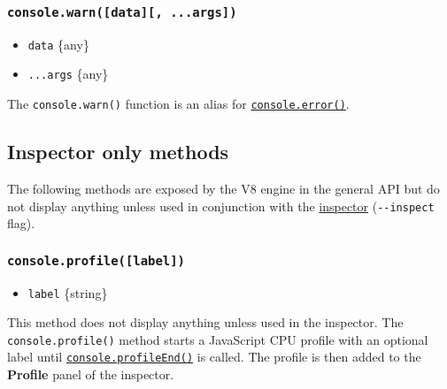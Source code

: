 \subsubsection{\texorpdfstring{\texttt{console.warn({[}data{]}{[},\ ...args{]})}}{console.warn({[}data{]}{[}, ...args{]})}}\label{console.warndata-...args}

\begin{itemize}
\tightlist
\item
  \texttt{data} \{any\}
\item
  \texttt{...args} \{any\}
\end{itemize}

The \texttt{console.warn()} function is an alias for
\hyperref[consoleerrordata-args]{\texttt{console.error()}}.

\subsection{Inspector only methods}\label{inspector-only-methods}

The following methods are exposed by the V8 engine in the general API
but do not display anything unless used in conjunction with the
\href{debugger.md}{inspector} (\texttt{-\/-inspect} flag).

\subsubsection{\texorpdfstring{\texttt{console.profile({[}label{]})}}{console.profile({[}label{]})}}\label{console.profilelabel}

\begin{itemize}
\tightlist
\item
  \texttt{label} \{string\}
\end{itemize}

This method does not display anything unless used in the inspector. The
\texttt{console.profile()} method starts a JavaScript CPU profile with
an optional label until
\hyperref[consoleprofileendlabel]{\texttt{console.profileEnd()}} is
called. The profile is then added to the \textbf{Profile} panel of the
inspector.

\begin{Shaded}
\begin{Highlighting}[]
\NormalTok{(}\NormalTok{)}\OperatorTok{;}
\NormalTok{(}\NormalTok{)}\OperatorTok{;}
\end{Highlighting}
\end{Shaded}


